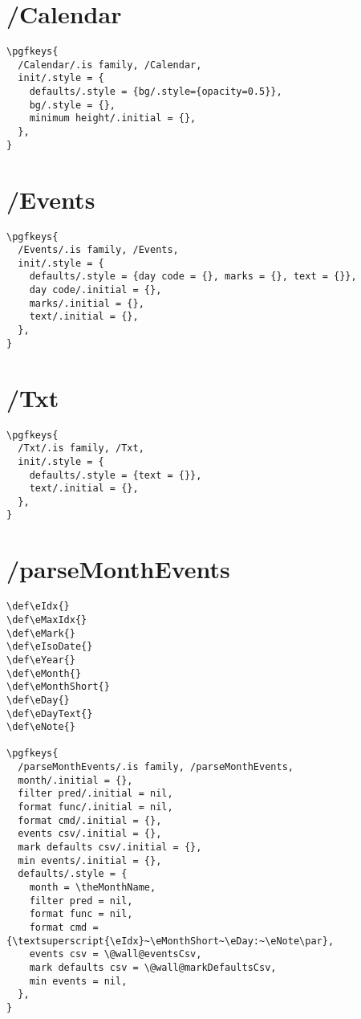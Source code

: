 \documentclass[11pt,oneside]{memoir-article}
\begin{document}
\section{/Calendar}
\label{sec:org2141145}

\begin{verbatim}
\pgfkeys{
  /Calendar/.is family, /Calendar,
  init/.style = {
    defaults/.style = {bg/.style={opacity=0.5}},
    bg/.style = {},
    minimum height/.initial = {},
  },
}
\end{verbatim}

\section{/Events}
\label{sec:org3ce3978}

\begin{verbatim}
\pgfkeys{
  /Events/.is family, /Events,
  init/.style = {
    defaults/.style = {day code = {}, marks = {}, text = {}},
    day code/.initial = {},
    marks/.initial = {},
    text/.initial = {},
  },
}
\end{verbatim}

\section{/Txt}
\label{sec:org8bf987b}

\begin{verbatim}
\pgfkeys{
  /Txt/.is family, /Txt,
  init/.style = {
    defaults/.style = {text = {}},
    text/.initial = {},
  },
}
\end{verbatim}

\section{/parseMonthEvents}
\label{sec:orgb0d314b}

\begin{verbatim}
\def\eIdx{}
\def\eMaxIdx{}
\def\eMark{}
\def\eIsoDate{}
\def\eYear{}
\def\eMonth{}
\def\eMonthShort{}
\def\eDay{}
\def\eDayText{}
\def\eNote{}

\pgfkeys{
  /parseMonthEvents/.is family, /parseMonthEvents,
  month/.initial = {},
  filter pred/.initial = nil,
  format func/.initial = nil,
  format cmd/.initial = {},
  events csv/.initial = {},
  mark defaults csv/.initial = {},
  min events/.initial = {},
  defaults/.style = {
    month = \theMonthName,
    filter pred = nil,
    format func = nil,
    format cmd = {\textsuperscript{\eIdx}~\eMonthShort~\eDay:~\eNote\par},
    events csv = \@wall@eventsCsv,
    mark defaults csv = \@wall@markDefaultsCsv,
    min events = nil,
  },
}
\end{verbatim}
\end{document}
